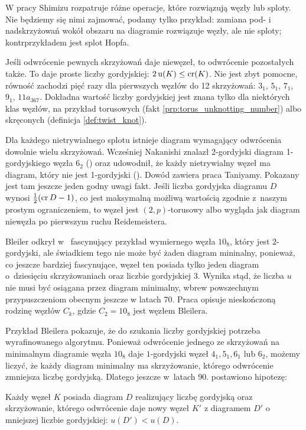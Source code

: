 W pracy \cite{shimizu14} Shimizu rozpatruje różne operacje, które rozwiązują węzły lub sploty.
Nie będziemy się nimi zajmować, podamy tylko przykład: zamiana pod- i nadskrzyżowań wokół obszaru na diagramie rozwiązuje węzły, ale nie sploty; kontrprzykładem jest splot Hopfa.

Jeśli odwrócenie pewnych skrzyżowań daje niewęzeł, to odwrócenie pozostałych także.
To daje proste liczby gordyjskiej: $2 \operatorname{u} (K) \le \operatorname{cr} (K)$.
Nie jest zbyt pomocne, równość zachodzi pięć razy dla pierwszych węzłów do 12 skrzyżowań: $3_{1}$, $5_{1}$, $7_{1}$, $9_{1}$, $11a_{367}$.
Dokładna wartość liczby gordyjskiej jest znana tylko dla niektórych klas węzłów, na przykład torusowych (fakt \ref{prp:torus_unknotting_number}) albo skręconych (definicja \ref{def:twist_knot}).

Dla każdego nietrywialnego splotu istnieje diagram wymagający odwrócenia dowolnie wielu skrzyżowań.
Wcześniej Nakanishi znalazł 2-gordyjski diagram 1-gordyjskiego węzła $6_2$ (\cite{nakanishi83}) oraz udowodnił, że każdy nietrywialny węzeł ma diagram, który nie jest 1-gordyjski (\cite{nakanishi96}).
Dowód zawiera praca \cite{taniyama09} Taniyamy.
Pokazany jest tam jeszcze jeden godny uwagi fakt.
Jeśli liczba gordyjska diagramu $D$ wynosi $\frac 12 (\operatorname{cr} D - 1)$, co jest maksymalną możliwą wartością zgodnie z~naszym prostym ograniczeniem,
to węzeł jest $(2,p)$-torusowy albo wygląda jak diagram niewęzła po pierwszym ruchu Reidemeistera.

Bleiler odkrył w~\cite{bleiler84} fascynujący przykład wymiernego węzła $10_8$, który jest $2$-gordyjski, ale świadkiem tego nie może być żaden diagram mininalny, ponieważ, co jeszcze bardziej fascynujące, węzeł ten posiada tylko jeden diagram o~dziesięciu skrzyżowaniach oraz liczbie gordyjskiej 3.
Wynika stąd, że liczba $u$ nie musi być osiągana przez diagram minimalny, wbrew powszechnym przypuszczeniom obecnym jeszcze w latach 70.
Praca \cite{bernhard94} opisuje nieskończoną rodzinę węzłów $C_k$, gdzie $C_2 = 10_8$ jest węzłem Bleilera.

Przykład Bleilera pokazuje, że do szukania liczby gordyjskiej potrzeba wyrafinowanego algorytmu.
Ponieważ odwrócenie jednego ze skrzyżowań na minimalnym diagramie węzła $10_8$ daje $1$-gordyjski węzeł $4_1, 5_1, 6_1$ lub $6_2$, możemy liczyć, że każdy diagram minimalny ma skrzyżowanie, którego odwrócenie zmniejsza liczbę gordyjską.
Dlatego jeszcze w~latach 90. postawiono hipotezę:

\begin{conjecture}
    \label{con:bernhard_jablan}
    Każdy węzeł $K$ posiada diagram $D$ realizujący liczbę gordyjską oraz skrzyżowanie, którego odwrócenie daje nowy węzeł $K'$ z diagramem $D'$ o mniejszej liczbie gordyjskiej: $u(D') < u(D)$.
\end{conjecture}

